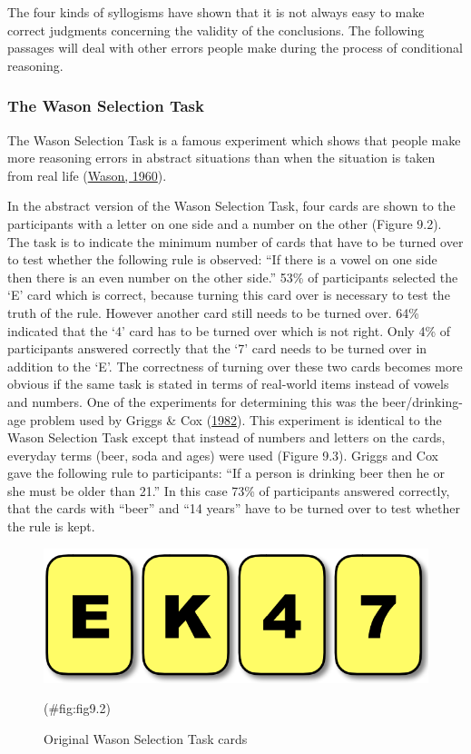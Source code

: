 \documentclass[
]{krantz}
\begin{document}
The four kinds of syllogisms have shown that it is not always easy to make correct judgments concerning the validity of the conclusions. The following passages will deal with other errors people make during the process of conditional reasoning.

\hypertarget{the-wason-selection-task}{%
\subsubsection*{The Wason Selection Task}\label{the-wason-selection-task}}


The Wason Selection Task is a famous experiment which shows that people make more reasoning errors in abstract situations than when the situation is taken from real life (\protect\hyperlink{ref-Wason1960}{Wason, 1960}).

In the abstract version of the Wason Selection Task, four cards are shown to the participants with a letter on one side and a number on the other (Figure 9.2). The task is to indicate the minimum number of cards that have to be turned over to test whether the following rule is observed: ``If there is a vowel on one side then there is an even number on the other side.'' 53\% of participants selected the `E' card which is correct, because turning this card over is necessary to test the truth of the rule. However another card still needs to be turned over. 64\% indicated that the `4' card has to be turned over which is not right. Only 4\% of participants answered correctly that the `7' card needs to be turned over in addition to the `E'. The correctness of turning over these two cards becomes more obvious if the same task is stated in terms of real-world items instead of vowels and numbers. One of the experiments for determining this was the beer/drinking-age problem used by Griggs \& Cox (\protect\hyperlink{ref-griggs1982elusive}{1982}). This experiment is identical to the Wason Selection Task except that instead of numbers and letters on the cards, everyday terms (beer, soda and ages) were used (Figure 9.3). Griggs and Cox gave the following rule to participants: ``If a person is drinking beer then he or she must be older than 21.'' In this case 73\% of participants answered correctly, that the cards with ``beer'' and ``14 years'' have to be turned over to test whether the rule is kept.

\begin{figure}

{\centering \includegraphics[width=0.6\linewidth]{images/ch9/fig2} 

}

\caption{Original Wason Selection Task cards}(\#fig:fig9.2)
\end{figure}
\end{document}
